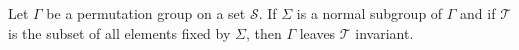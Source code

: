 Let $\Gamma$ be a permutation group on a set $\mathcal{S}$. If $\Sigma$ is a normal subgroup of $\Gamma$ and if $\mathcal{T}$ is the subset of all elements fixed by $\Sigma$, then $\Gamma$ leaves $\mathcal{T}$ invariant.
